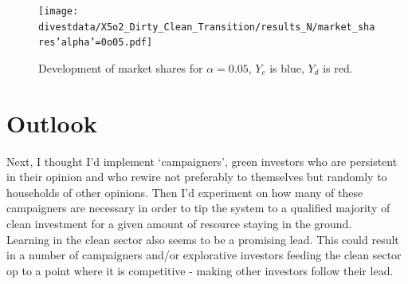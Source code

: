 \begin{figure}[H]
	\centering
	\texttt{[image: divestdata/X5o2\_Dirty\_Clean\_Transition/results\_N/market\_shares'alpha'=0o05.pdf]}
	\caption{Development of market shares for $\alpha=0.05$, $Y_c$ is blue, $Y_d$ is red.}

\end{figure}

\section{Outlook}
Next, I thought I'd implement `campaigners', green investors who are persistent in their opinion and who rewire not preferably to themselves but randomly to households of other opinions. Then I'd experiment on how many of these campaigners are necessary in order to tip the system to a qualified majority of clean investment for a given amount of resource staying in the ground. \\

Learning in the clean sector also seems to be a promising lead. This could result in a number of campaigners and/or explorative investors feeding the clean sector op to a point where it is competitive - making other investors follow their lead.
\newpage

{}
    
